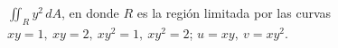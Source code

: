 \item $\iint_R y^2 \, dA$, en donde $R$ es la región limitada por las curvas $xy = 1, \ xy = 2, \ xy^2 = 1, \ xy^2 = 2$; $u = xy, \ v = xy^2$.
